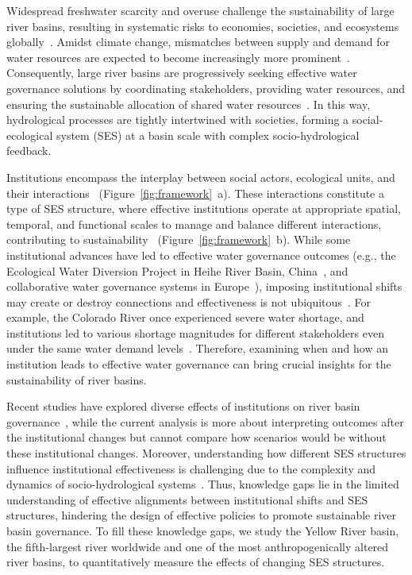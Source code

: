 Widespread freshwater scarcity and overuse challenge the sustainability of large river basins, resulting in systematic risks to economies, societies, and ecosystems globally~\cite{distefano2017, dolan2021, xu2020b, mekonnen2016}.
Amidst climate change, mismatches between supply and demand for water resources are expected to become increasingly more prominent~\cite{florke2018, yoon2021}.
Consequently, large river basins are progressively seeking effective water governance solutions by coordinating stakeholders, providing water resources, and ensuring the sustainable allocation of shared water resources~\cite{wang2019d}.
In this way, hydrological processes are tightly intertwined with societies, forming a social-ecological system (SES) at a basin scale with complex socio-hydrological feedback.

Institutions encompass the interplay between social actors, ecological units, and their interactions~\cite{young2008, lien2020, bodin2017b, wang2022g} (Figure~\ref{fig:framework}~a).
These interactions constitute a type of SES structure, where effective institutions operate at appropriate spatial, temporal, and functional scales to manage and balance different interactions, contributing to sustainability~\cite{epstein2015, wang2019d} (Figure~\ref{fig:framework}~b).
While some institutional advances have led to effective water governance outcomes (e.g., the Ecological Water Diversion Project in Heihe River Basin, China~\cite{wang2019d}, and collaborative water governance systems in Europe~\cite{green2013}), imposing institutional shifts may create or destroy connections and effectiveness is not ubiquitous~\cite{loos2022}.
For example, the Colorado River once experienced severe water shortage, and institutions led to various shortage magnitudes for different stakeholders even under the same water demand levels~\cite{hadjimichael2020}.
Therefore, examining when and how an institution leads to effective water governance can bring crucial insights for the sustainability of river basins.

Recent studies have explored diverse effects of institutions on river basin governance~\cite{bouckaert2022, vallury2022, loch2020, kirchhoff2016}, while the current analysis is more about interpreting outcomes after the institutional changes but cannot compare how scenarios would be without these institutional changes.
Moreover, understanding how different SES structures influence institutional effectiveness is challenging due to the complexity and dynamics of socio-hydrological systems~\cite{bodin2017b}.
Thus, knowledge gaps lie in the limited understanding of effective alignments between institutional shifts and SES structures, hindering the design of effective policies to promote sustainable river basin governance.
To fill these knowledge gaps, we study the Yellow River basin, the fifth-largest river worldwide and one of the most anthropogenically altered river basins, to quantitatively measure the effects of changing SES structures.

